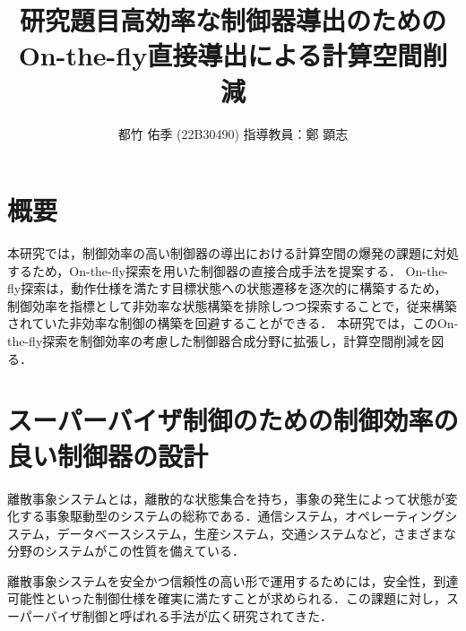 \documentclass[11pt]{jarticle}
\begin{document}

\title{研究題目}
\title{高効率な制御器導出のための\\On-the-fly直接導出による計算空間削減}
\author{都竹 佑季 (22B30490) \;\; 指導教員：鄭 顕志}
\date{\empty} %
\maketitle %
\thispagestyle{fancy}


\section{概要} %
本研究では，制御効率の高い制御器の導出における計算空間の爆発の課題に対処するため，On-the-fly探索を用いた制御器の直接合成手法を提案する．
On-the-fly探索は，動作仕様を満たす目標状態への状態遷移を逐次的に構築するため，制御効率を指標として非効率な状態構築を排除しつつ探索することで，従来構築されていた非効率な制御の構築を回避することができる．
本研究では，このOn-the-fly探索を制御効率の考慮した制御器合成分野に拡張し，計算空間削減を図る．

\section{スーパーバイザ制御のための制御効率の良い制御器の設計}
離散事象システムとは，離散的な状態集合を持ち，事象の発生によって状態が変化する事象駆動型のシステムの総称である．通信システム，オペレーティングシステム，データベースシステム，生産システム，交通システムなど，さまざまな分野のシステムがこの性質を備えている．

離散事象システムを安全かつ信頼性の高い形で運用するためには，安全性，到達可能性といった制御仕様を確実に満たすことが求められる．この課題に対し，スーパーバイザ制御と呼ばれる手法が広く研究されてきた．
\end{document}
